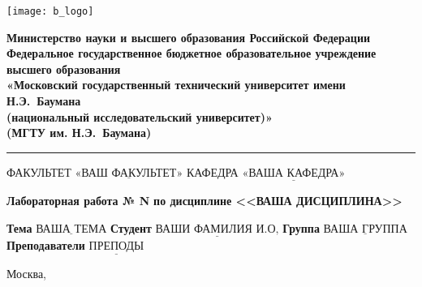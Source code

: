 \thispagestyle{empty}

\noindent \begin{minipage}{0.15\textwidth}
	\texttt{[image: b\_logo]}
\end{minipage}
\noindent\begin{minipage}{0.85\textwidth}\centering
	\textbf{Министерство науки и высшего образования Российской Федерации}\\
	\textbf{Федеральное государственное бюджетное образовательное учреждение высшего образования}\\
	\textbf{«Московский государственный технический университет имени Н.Э.~Баумана}\\
	\textbf{(национальный исследовательский университет)»}\\
	\textbf{(МГТУ им. Н.Э.~Баумана)}
\end{minipage}

\noindent\rule{\linewidth}{3pt}
\newline\newline
\noindent ФАКУЛЬТЕТ $\underline{\text{«ВАШ ФАКУЛЬТЕТ»}}$ \newline\newline
\noindent КАФЕДРА $\underline{\text{«ВАША КАФЕДРА»}}$

\vspace{1cm}

\begin{center}
	\noindent\begin{minipage}{1.3\textwidth}\centering
		\Large\textbf{  Лабораторная работа № N}\newline
		\textbf{по дисциплине <<ВАША ДИСЦИПЛИНА>>}\newline\newline
	\end{minipage}
\end{center}

\noindent\textbf{Тема} $\underline{\text{ВАША ТЕМА}}$\newline\newline
\noindent\textbf{Студент} $\underline{\text{ВАШИ ФАМИЛИЯ И.О,}}$\newline\newline
\noindent\textbf{Группа} $\underline{\text{ВАША ГРУППА}}$\newline\newline
\noindent\textbf{Преподаватели} $\underline{\text{ПРЕПОДЫ}}$\newline

\begin{center}
	\vfill
	Москва,~\the\year
\end{center}
\clearpage
